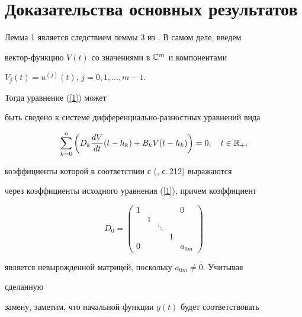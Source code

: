 


\section{Доказательства основных результатов} 


 


Лемма 1 является следствием леммы 3 из \cite{1}. В самом деле, введем 


вектор-функцию $V(t)$ со значениями в $\Bbb C^m$ и компонентами 


$V_j(t)=u^{(j)}(t)$, $j=0,1,\dotsc,m-1$. 


Тогда уравнение (\ref{1}) может 


быть сведено к системе дифференциально-разностных уравнений вида 


\begin{equation} 


\label{10} 


\sum^n_{k=0}\bigg(D_k\frac{dV}{dt}(t-h_k)+B_k V(t-h_k)\bigg)=0, 


\quad t\in\Bbb R_+, 


\end{equation} 


коэффициенты которой в соответствии с (\cite{4}, с.\,212) выражаются 


через коэффициенты исходного уравнения (\ref{1}), причем коэффициент 


$$ 


D_0= 


\begin{pmatrix} 


1 & \ & \ & \ & 0\\ 


\ & 1 & \ & \ & \ \\ 


\ & \ & \ddots & \ & \ \\ 


\ & \ & \ & 1 & \ \\


0 & \ & \ & \ & a_{0m} 


\end{pmatrix} 


$$ 


является невырожденной матрицей, поскольку $a_{0m}\ne 0$. Учитывая 


сделанную 


замену, заметим, что начальной функции $y(t)$ будет соответствовать 


